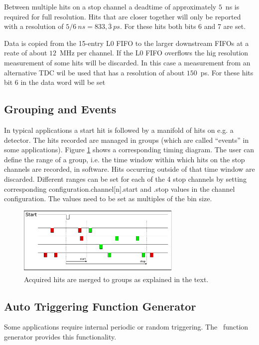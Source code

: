 {			Between multiple hits on a stop channel a deadtime of approximately $5$~ns is required for full resolution. 
			Hits that are closer together will only be reported with a resolution of $5/6~ns = 833,\overline{3}~ps$. For these hits both bits 6 and 7 are set.

			Data is copied from the 15-entry L0 FIFO to the larger downstream FIFOs at a reate of about $12$~MHz per channel. 
			If the L0 FIFO overflows the hig resolution measurement of some hits will be discarded. 
			In this case a measurement from an alternative TDC wil be used that has a resolution of about $150$~ps. 
			For these hits bit 6 in the data word will be set
	}

	\subsection{Grouping and Events}
		In typical applications a start hit is followed by a manifold of hits on e.g. a detector. 
		The hits recorded are managed in groups (which are called ``events'' in some applications). 
		Figure \ref{fig:grouping} shows a corresponding timing diagram. The user can define the range of a group, i.e. the time window within which hits 
		on the stop channels are recorded, in software. Hits occurring outside of that time window are discarded. 
		 Different ranges can be set for each of the 4 stop channels by setting corresponding configuration.channel[n].start and .stop values in the channel configuration. 
		The values need to be set as multiples of the bin size.

		\begin{figure}[ht]
			\begin{center}
				\includegraphics[width=0.7\textwidth]{figures/grouping.pdf}
				\caption{Acquired hits are merged to groups as explained in the text.\label{fig:grouping}}
			\end{center}
		\end{figure}
	
	\subsection{Auto Triggering Function Generator\label{cp:AutoTriggeringFunctionGenerator}}
		Some applications require internal periodic or random triggering. The \deviceName\ function generator provides this functionality.\par


